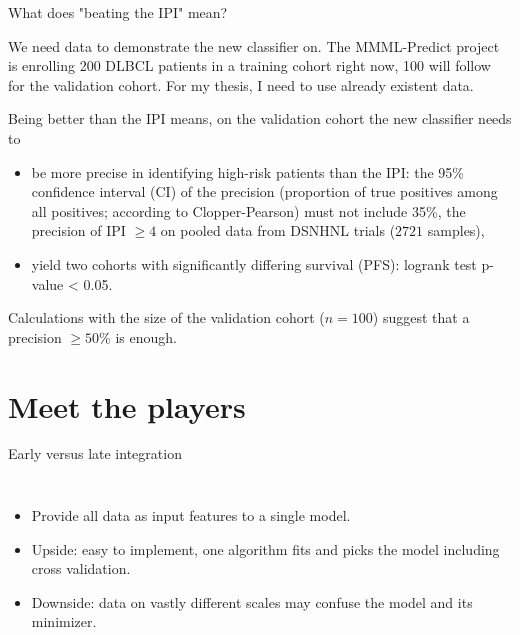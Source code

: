 \documentclass[10pt, aspectratio=169]{beamer}
\begin{document}
\begin{frame}{What does "beating the IPI" mean?}

  We need \alert{data} to demonstrate the new classifier on. The MMML-Predict project is enrolling 200 DLBCL 
  patients in a training cohort right now, 100 will follow for the validation cohort. For my thesis,
  I need to use already existent data.

  Being better than the IPI means, on the validation cohort the new classifier needs to 

  \begin{itemize}
    \item be \alert{more precise in identifying high-risk patients} than the IPI: the 95\% confidence interval (CI) 
    of the precision (proportion of true positives among all positives; according to Clopper-Pearson) must 
    not include 35\%, the precision of IPI $\geq 4$ on pooled data from DSNHNL trials ($\num{2721}$ samples),
    \item yield \alert{two cohorts with significantly differing survival} (PFS): logrank test p-value < 0.05.
  \end{itemize}

  Calculations with the size of the validation cohort ($n = 100$) suggest that a precision $\geq 50\%$ is enough.
\end{frame}

\section{Meet the players}

\begin{frame}{\alert{Early} versus late integration}
  \begin{columns}
      \centering
      \begin{itemize}
        \item Provide all data as input features to a single model.
        \item Upside: easy to implement, one algorithm fits and picks the model 
          including cross validation.
        \item Downside: data on vastly different scales may confuse the model and 
          its minimizer.
      \end{itemize}
  \end{columns}
\end{frame}
\end{document}
